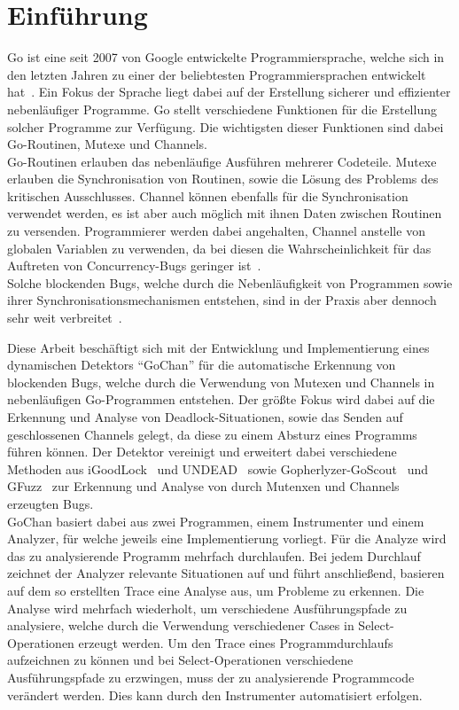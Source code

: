 \chapter{Einführung}\label{chap:introduction}
Go ist eine seit 2007 von Google entwickelte Programmiersprache, welche sich 
in den letzten Jahren zu einer der beliebtesten Programmiersprachen entwickelt 
hat~\cite{ranking}. Ein Fokus der Sprache liegt dabei auf der Erstellung
sicherer und effizienter nebenläufiger Programme. Go stellt verschiedene 
Funktionen für die Erstellung solcher Programme zur Verfügung.
Die wichtigsten dieser Funktionen sind dabei Go-Routinen, Mutexe und 
Channels.\\Go-Routinen erlauben das nebenläufige Ausführen mehrerer Codeteile.
Mutexe erlauben die Synchronisation von Routinen, sowie die Lösung des Problems 
des kritischen Ausschlusses. 
Channel können ebenfalls für die Synchronisation verwendet werden,
es ist aber auch möglich mit ihnen Daten zwischen Routinen zu versenden. 
Programmierer werden dabei angehalten, Channel
anstelle von globalen Variablen zu verwenden, da bei diesen die Wahrscheinlichkeit
für das Auftreten von Concurrency-Bugs geringer ist~\cite{sharedMemory}.\\
Solche blockenden Bugs, welche durch die Nebenläufigkeit von Programmen sowie ihrer 
Synchronisationsmechanismen entstehen, sind in der Praxis aber dennoch sehr weit 
verbreitet~\cite{numberBugs}.

Diese Arbeit beschäftigt sich mit der Entwicklung und Implementierung
eines dynamischen Detektors ``GoChan'' für die automatische Erkennung
von blockenden Bugs, welche durch die Verwendung von Mutexen und Channels 
in nebenläufigen Go-Programmen entstehen. Der größte Fokus wird dabei 
auf die Erkennung und Analyse von Deadlock-Situationen, sowie das Senden 
auf geschlossenen Channels gelegt, da diese zu einem Absturz eines Programms 
führen können. Der Detektor vereinigt und erweitert dabei verschiedene Methoden aus 
iGoodLock~\cite{iGoodLock} und UNDEAD~\cite{Undead} sowie 
Gopherlyzer-GoScout~\cite{PPDP18} und GFuzz~\cite{gfuzz} zur 
Erkennung und Analyse von 
durch Mutenxen und Channels erzeugten Bugs.\\
GoChan basiert dabei aus zwei Programmen, einem Instrumenter und einem 
Analyzer, für welche jeweils eine 
Implementierung vorliegt.
Für die Analyze wird das zu analysierende Programm 
mehrfach durchlaufen. Bei jedem Durchlauf zeichnet der Analyzer relevante 
Situationen auf und führt anschließend, basieren auf dem so erstellten Trace 
eine Analyse aus, um Probleme zu erkennen. Die Analyse wird mehrfach wiederholt, 
um verschiedene Ausführungspfade zu analysiere, welche durch die Verwendung 
verschiedener Cases in Select-Operationen erzeugt werden. Um den Trace eines 
Programmdurchlaufs aufzeichnen zu können und bei Select-Operationen verschiedene 
Ausführungspfade zu erzwingen, muss der zu analysierende Programmcode 
verändert werden. Dies kann durch den Instrumenter automatisiert erfolgen.

